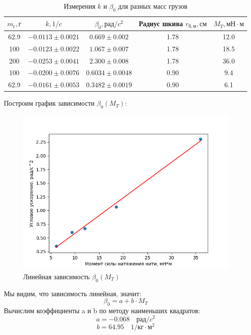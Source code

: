 \documentclass[a4paper,12pt]{article}
\begin{document}
\begin{enumerate}
\begin{table}[h]
        \centering
        \begin{tabular}{|c|c|c|c|c|}
            \hline
            $m_г, г$ & $k, 1/c$& $\beta_0, рад/c^2$ & Радиус шкива $r_{б, м}, см$ & $ M_T, мН \cdot м $ \\ 
            \hline
            62.9 & $-0.0113 \pm 0.0021 $ & $ 0.669  \pm 0.002  $ & 1.78 & 12.0 \\
        	100  & $ -0.0123\pm 0.0022 $ & $ 1.067  \pm 0.007  $ & 1.78 & 18.5 \\
        	200  & $ -0.0253\pm 0.0041 $ & $ 2.300  \pm 0.008  $ & 1.78 & 36.0 \\
        	100  & $ -0.0200\pm 0.0076 $ & $ 0.6034 \pm 0.0048 $ & 0.90 & 9.4  \\
        	62.9 & $ -0.0161\pm 0.0053 $ & $ 0.3482 \pm 0.0019 $ & 0.90 & 6.1 \\ 
            \hline
        \end{tabular}
        \caption{Измерения $k$ и $\beta_0$ для разных масс грузов}

    \end{table}
    Построим график зависимости $\beta_0(M_T)$:
    \begin{figure}[h]
        \centering
        \includegraphics[scale = 0.8]{1.png}
        \caption{Линейная зависимость $\beta_0(M_T)$}
        \label{fig:enter-label}
    \end{figure}
        
        Мы видим, что зависимость линейная, значит:
        \begin{displaymath}
            \beta_0 = a + b \cdot M_T
        \end{displaymath}
    Вычислим коэффициенты a и b по методу наименьших квадратов:
    \begin{displaymath}
        a = -0.068 \quad рад/c^2
    \end{displaymath}
    \begin{displaymath}
        b = 64.95 \quad 1/кг \cdot м^2
    \end{displaymath}


\end{enumerate}
\end{document}
